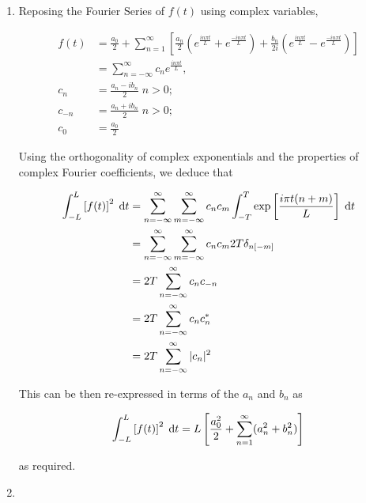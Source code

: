 \documentclass[a4paper]{article}
\begin{document}
\begin{enumerate}
	\item Reposing the Fourier Series of $ f(t) $ using complex variables,
	
	\begin{align*}
	f(t) & = \frac{a_{0}}{2} + \sum_{n=1}^{\infty}  \left[   \frac{a_{n}}{2} \left(   e^{\frac{i n \pi t}{L}} + e^{\frac{- i n \pi t}{L}} \right) + \frac{b_{n}}{2i} \left( e^{\frac{i n \pi t}{L}} - e^{\frac{-i n \pi t}{L}} \right)   \right]  \\
	& = \sum_{n=-\infty}^{\infty}  c_{n} e^{\frac{i n \pi t}{L}}, \\
	c_{n} & = \frac{a_{n} - i b_{n}}{2} \; n > 0 ; \\
	c_{-n} & = \frac{a_{n} + i b_{n}}{2} \; n > 0 ; \\
	c_{0} & = \frac{a_{0}}{2}
	\end{align*}
	
	Using the orthogonality of complex exponentials and the properties of complex Fourier coefficients, we deduce that
	
	\begin{align*}
	\int_{-L}^{L} \left[  f(t) \right]^{2} \; \mathrm{d} t  & = \sum_{n = - \infty}^{\infty} \sum_{m = -\infty}^{\infty} c_{n} c_{m} \int_{-T}^{T} \exp \left[   \frac{i \pi t (n + m)}{L} \right]  \; \mathrm{d} t \\
	& = \sum_{n = - \infty}^{\infty} \sum_{m = -\infty}^{\infty} c_{n} c_{m} 2 T \delta_{n[-m]}  \; \\ 
	& = 2 T \sum_{n = - \infty}^{\infty} c_{n} c_{-n} \\
	& = 2 T \sum_{n = - \infty}^{\infty} c_{n} c_{n}^{*} \\
	& = 2 T \sum_{n = - \infty}^{\infty} | c_{n} |^{2} \\
	\end{align*}
	
	This can be then re-expressed in terms of the $ a_{n} $ and $ b_{n} $ as 
	
	\[ \int_{-L}^{L} \left[  f(t) \right]^{2} \; \mathrm{d} t  = L  \left[   \frac{a_{0}^{2}}{2} +\sum_{n=1}^{\infty} (a_{n}^{2} + b_{n}^{2}) \right]  \]
	
	as required. 
	 
	\item 
	
	\begin{center}
	\end{center}
	

\end{enumerate}
\end{document}
